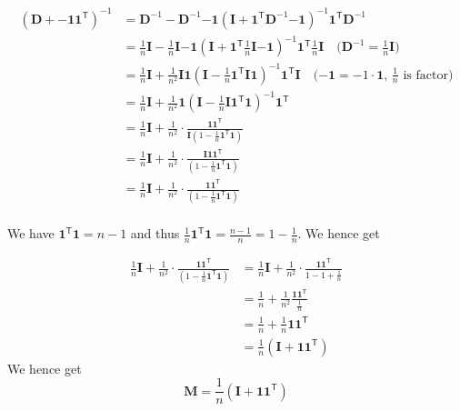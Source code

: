 \documentclass{article}
\begin{document}
\begin{align*}
     \left(\mathbf{D} + \mathbf{-1}\mathbf{1}^{\mathsf{T}}\right)^{-1} &= \mathbf{D}^{-1} - \mathbf{D}^{-1}\mathbf{-1}\left(\mathbf{I} + \mathbf{1}^{\mathsf{T}}\mathbf{D}^{-1}\mathbf{-1}\right)^{-1}\mathbf{1}^{\mathsf{T}}\mathbf{D}^{-1} \\
    &= \frac{1}{n}\mathbf{I} - \frac{1}{n}\mathbf{I}\mathbf{-1}\left(\mathbf{I} + \mathbf{1}^{\mathsf{T}}\frac{1}{n}\mathbf{I}\mathbf{-1}\right)^{-1}\mathbf{1}^{\mathsf{T}}\frac{1}{n}\mathbf{I} \quad \text{($\mathbf{D}^{-1} = \frac{1}{n}\mathbf{I}$)} \\
     &= \frac{1}{n}\mathbf{I} + \frac{1}{n^{2}}\mathbf{I}\mathbf{1}\left(\mathbf{I} -  \frac{1}{n}\mathbf{1}^{\mathsf{T}}\mathbf{I}\mathbf{1}\right)^{-1}\mathbf{1}^{\mathsf{T}}\mathbf{I} \quad \text{($\mathbf{-1} = -1\cdot \mathbf{1}$, $\frac{1}{n}$ is factor)} \\
     &= \frac{1}{n}\mathbf{I} + \frac{1}{n^{2}}\mathbf{1}\left(\mathbf{I} -  \frac{1}{n}\mathbf{I}\mathbf{1}^{\mathsf{T}}\mathbf{1}\right)^{-1}\mathbf{1}^{\mathsf{T}} \\
     &= \frac{1}{n}\mathbf{I} + \frac{1}{n^{2}} \cdot\frac{\mathbf{1}\mathbf{1}^{\mathsf{T}}}{\mathbf{I}\left(1 - \frac{1}{n}\mathbf{1}^{\mathsf{T}}\mathbf{1}\right)} \\
     &= \frac{1}{n}\mathbf{I} + \frac{1}{n^{2}} \cdot\frac{\mathbf{I}\mathbf{1}\mathbf{1}^{\mathsf{T}}}{\left(1 - \frac{1}{n}\mathbf{1}^{\mathsf{T}}\mathbf{1}\right)} \\
     &= \frac{1}{n}\mathbf{I} + \frac{1}{n^{2}} \cdot\frac{\mathbf{1}\mathbf{1}^{\mathsf{T}}}{\left(1 - \frac{1}{n}\mathbf{1}^{\mathsf{T}}\mathbf{1}\right)} \\
\end{align*}

We have $\mathbf{1}^{\mathsf{T}}\mathbf{1} = n-1$ and thus $\frac{1}{n}\mathbf{1}^{\mathsf{T}}\mathbf{1} = \frac{n-1}{n} = 1 - \frac{1}{n}$. We hence get

\begin{align*}
    \frac{1}{n}\mathbf{I} + \frac{1}{n^{2}} \cdot\frac{\mathbf{1}\mathbf{1}^{\mathsf{T}}}{\left(1 - \frac{1}{n}\mathbf{1}^{\mathsf{T}}\mathbf{1}\right)} &= \frac{1}{n}\mathbf{I} + \frac{1}{n^{2}} \cdot\frac{\mathbf{1}\mathbf{1}^{\mathsf{T}}}{1 - 1 +\frac{1}{n}}  \\
    &= \frac{1}{n} + \frac{1}{n^{2}}\frac{\mathbf{1}\mathbf{1}^{\mathsf{T}}}{\frac{1}{n}} \\
    &= \frac{1}{n} + \frac{1}{n}\mathbf{1}\mathbf{1}^{\mathsf{T}} \\
    &= \frac{1}{n}\left(\mathbf{I} + \mathbf{1}\mathbf{1}^{\mathsf{T}}\right)
\end{align*}
We hence get 
\begin{equation*}
    \mathbf{M} = \frac{1}{n}\left(\mathbf{I} + \mathbf{1}\mathbf{1}^{\mathsf{T}}\right)
\end{equation*}
\end{document}

